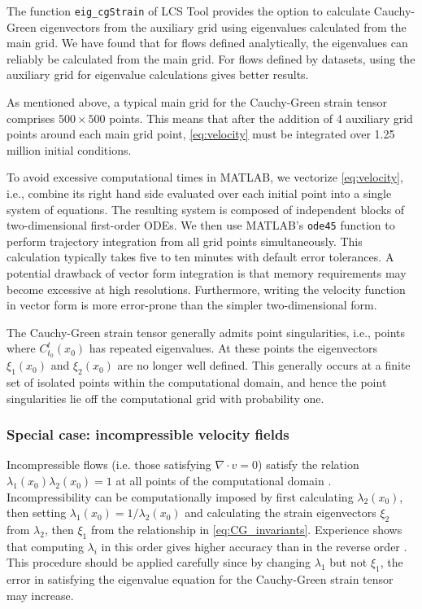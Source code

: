 \documentclass{article}
\begin{document}
The function \lstinline!eig_cgStrain! of LCS Tool provides the option to calculate Cauchy-Green eigenvectors from the auxiliary grid using eigenvalues calculated from the main grid. We have found that for flows defined analytically, the eigenvalues can reliably be calculated from the main grid. For flows defined by datasets, using the auxiliary grid for eigenvalue calculations gives better results.

As mentioned above, a typical main grid for the Cauchy-Green strain tensor comprises $500 \times 500$ points. This means that after the addition of 4 auxiliary grid points around each main grid point, \cref{eq:velocity} must be integrated over 1.25 million initial conditions.

To avoid excessive computational times in MATLAB, we vectorize \cref{eq:velocity}, i.e., combine its right hand side evaluated over each initial point into a single system of equations. The resulting system is composed of independent blocks of two-dimensional first-order ODEs. We then use MATLAB's \lstinline!ode45! function to perform trajectory integration from all grid points simultaneously. This calculation typically takes five to ten minutes with default error tolerances. A potential drawback of vector form integration is that memory requirements may become excessive at high resolutions. Furthermore, writing the velocity function in vector form is more error-prone than the simpler two-dimensional form.

The Cauchy-Green strain tensor generally admits point singularities, i.e., points where $C_{t_0}^t(x_0)$ has repeated eigenvalues. At these points the eigenvectors $\xi_1(x_0)$ and $\xi_2(x_0)$ are no longer well defined. This generally occurs at a finite set of isolated points within the computational domain\parencite{delmarcelle94}, and hence the point singularities lie off the computational grid with probability one.

\subsubsection{Special case: incompressible velocity fields}

Incompressible flows (i.e. those satisfying $\nabla \cdot v=0$) satisfy the relation $\lambda_1(x_0) \lambda_2(x_0) = 1$ at all points of the computational domain \parencite{arnold78:_mathem}. Incompressibility can be computationally imposed by first calculating $\lambda_2(x_0)$, then setting $\lambda_1(x_0) = 1/\lambda_2(x_0)$ and calculating the strain eigenvectors $\xi_2$ from $\lambda_2$, then $\xi_1$ from the relationship in \cref{eq:CG_invariants}. Experience shows that computing $\lambda_i$ in this order gives higher accuracy than in the reverse order \parencite{farazmand12:_comput_lagran}. This procedure should be applied carefully since by changing $\lambda_1$ but not $\xi_1$, the error in satisfying the eigenvalue equation for the Cauchy-Green strain tensor may increase.
\end{document}

